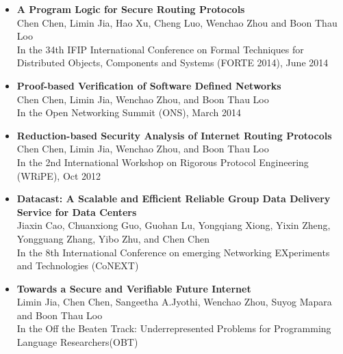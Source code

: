 \begin{itemize}
\item {\bf A Program Logic for Secure Routing Protocols} \\
Chen Chen, Limin Jia, Hao Xu, Cheng Luo, Wenchao Zhou and Boon Thau Loo\\
In the 34th IFIP International Conference on Formal Techniques for Distributed
Objects, Components and Systems (FORTE 2014), June 2014\\
\item {\bf Proof-based Verification of Software Defined Networks} \\
Chen Chen, Limin Jia, Wenchao Zhou, and Boon Thau Loo \\
In the Open Networking Summit (ONS), March 2014\\
\item {\bf Reduction-based Security Analysis of Internet Routing Protocols} \\
Chen Chen, Limin Jia, Wenchao Zhou, and Boon Thau Loo \\
In the 2nd International Workshop on Rigorous Protocol Engineering (WRiPE), Oct 2012 \\
\item {\bf Datacast: A Scalable and Efficient Reliable Group Data Delivery Service for Data Centers} \\
Jiaxin Cao, Chuanxiong Guo, Guohan Lu, Yongqiang Xiong, Yixin Zheng, Yongguang
Zhang, Yibo Zhu, and Chen Chen \\
In the 8th International Conference on emerging Networking EXperiments and Technologies (CoNEXT)\\
\item {\bf Towards a Secure and Verifiable Future Internet} \\
Limin Jia, Chen Chen, Sangeetha A.Jyothi, Wenchao Zhou, Suyog Mapara and Boon Thau Loo \\
In the Off the Beaten Track: Underrepresented Problems for Programming Language Researchers(OBT)\\
\end{itemize}

